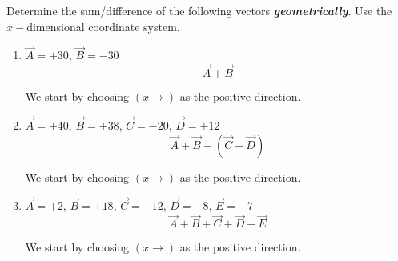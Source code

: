 \documentclass[12pt]{article} %
\begin{document}
\begin{qstn}[2]
\begin{enumerate}[label=(\alph*)]
    \end{enumerate}
\end{qstn}



\begin{qstn}[3]
    Determine the sum/difference of the following vectors \textbf{\emph{geometrically}}. Use the $x-$dimensional coordinate system.
\begin{enumerate}[label=(\alph*)]
    \item $\vec A = +30$, $\vec B = -30$ $$\vec A + \vec B$$

        \begin{soln}
            We start by choosing $(x \rightarrow)$ as the positive direction.
            \vspace*{5cm}
        \end{soln}





    \item $\vec A = +40$, $\vec B = +38$, $\vec C = -20$, $\vec D = +12$   $$\vec A + \vec B - (\vec C + \vec D)$$


    
      \begin{soln}
           We start by choosing $(x \rightarrow)$ as the positive direction.
            \newpage
      \end{soln} 




    \item $\vec A = +2$, $\vec B = +18$, $\vec C = -12$, $\vec D = -8$, $\vec E = +7$  $$\vec A  + \vec B + \vec C + \vec D - \vec E$$



    \begin{soln}
        We start by choosing $(x \rightarrow)$ as the positive direction.
        \vspace*{17cm}
   \end{soln} 



\end{enumerate}


\end{qstn}
\end{document}
